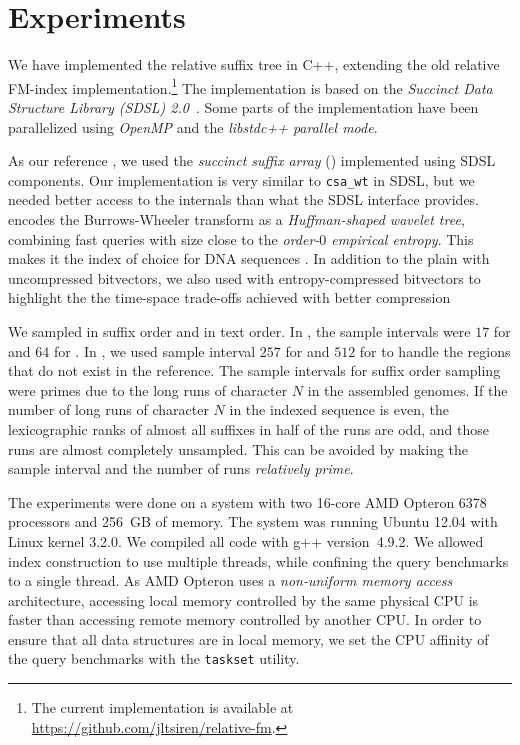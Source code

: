 \section{Experiments}

We have implemented the relative suffix tree in C++, extending the
old relative FM-index implementation.\footnote{The current implementation is available
at \url{https://github.com/jltsiren/relative-fm}.} The implementation is based
on the \emph{Succinct Data Structure Library (SDSL) 2.0}~\cite{Gog2014b}. Some
parts of the implementation have been parallelized using \emph{OpenMP} and the
\emph{libstdc++ parallel mode}.

As our reference \CSA{}, we used the \emph{succinct suffix array} (\SSA{})
\cite{Ferragina2007a,Maekinen2005} implemented using SDSL components. Our
implementation is very similar to \texttt{csa\_wt} in SDSL, but we needed
better access to the internals than what the SDSL interface
provides. \SSA{} encodes the Burrows-Wheeler transform as a \emph{Huffman-shaped
wavelet tree}, combining fast queries with size close to the
\emph{order\nobreakdash-$0$ empirical entropy}. This makes it the
index of choice for DNA sequences \cite{Ferragina2009a}. In addition to
the plain \SSA{} with uncompressed bitvectors, we also used \SSArrr{} with
entropy-compressed bitvectors \cite{Raman2007} to highlight the
the time-space trade-offs achieved with better compression

We sampled \SA{} in suffix order and \ISA{} in text order. In \SSA, the sample
intervals were $17$ for \SA{} and $64$ for \ISA. In \RFM, we used sample
interval $257$ for \SA{} and $512$ for \ISA{} to handle the regions that do
not exist in the reference. The sample intervals for suffix order sampling
were primes due to the long runs of character $N$ in the assembled genomes. If
the number of long runs of character $N$ in the indexed sequence is even, the
lexicographic ranks of almost all suffixes in half of the runs are odd, and
those runs are almost completely unsampled. This can be avoided by making the
sample interval and the number of runs \emph{relatively prime}.

The experiments were done on a system with two 16\nobreakdash-core AMD Opteron 6378 processors and 256~GB of memory. The system was running Ubuntu 12.04 with Linux kernel 3.2.0. We compiled all code with g++ version~4.9.2. We allowed index construction to use multiple threads, while confining the query benchmarks to a single thread. As AMD Opteron uses a \emph{non-uniform memory access} architecture, accessing local memory controlled by the same physical CPU is faster than accessing remote memory controlled by another CPU. In order to ensure that all data structures are in local memory, we set the CPU affinity of the query benchmarks with the \texttt{taskset} utility.

